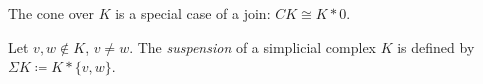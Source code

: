 \begin{remark}
    The cone over $K$ is a special case of a join: $\mathit{CK} \cong K * 0$.
\end{remark}

\begin{definition}
    Let $v, w \notin K$, $v \neq w$. The \emph{suspension} of a simplicial complex $K$ is defined by $\Sigma K \coloneqq K * \{v,w\}$.
\end{definition}



